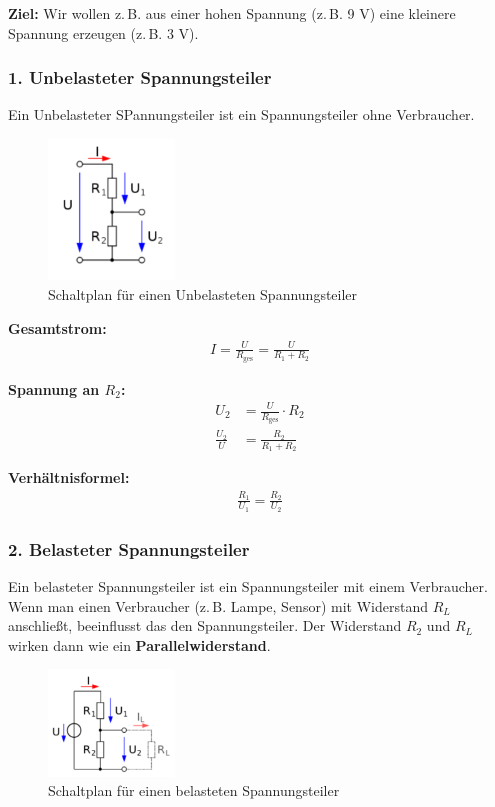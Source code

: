 \documentclass{article}
\begin{document}
\vspace{1em}

\noindent \textbf{Ziel:} Wir wollen z.\,B. aus einer hohen Spannung (z.\,B. 9 V) eine kleinere Spannung erzeugen (z.\,B. 3 V).

\subsubsection*{1. Unbelasteter Spannungsteiler}
Ein Unbelasteter SPannungsteiler ist ein Spannungsteiler ohne Verbraucher.
\begin{figure}[H]
    \centering
    \includegraphics[width=0.3\textwidth]{spannungsteiler 1.png}
    \caption{Schaltplan für einen Unbelasteten Spannungsteiler}
\end{figure}

\textbf{Gesamtstrom:}
\begin{align}
    I =\frac{U}{R_\text{ges}}= \frac{U}{R_1 + R_2}
\end{align}



\textbf{Spannung an $R_2$:}
\begin{align}
U_2 &= \frac{U}{R_\text{ges}}\cdot R_2\\
  \frac{U_2}{U}  &=\frac{R_2}{R_1+R_2}
\end{align}

\textbf{Verhältnisformel:}
\begin{align}
    \frac{R_1}{U_1}=\frac{R_2}{U_2}
\end{align}

\subsubsection*{2. Belasteter Spannungsteiler}
Ein belasteter Spannungsteiler ist ein Spannungsteiler mit einem Verbraucher.
Wenn man einen Verbraucher (z.\,B. Lampe, Sensor) mit Widerstand $R_L$ anschließt, beeinflusst das den Spannungsteiler. Der Widerstand $R_2$ und $R_L$ wirken dann wie ein \textbf{Parallelwiderstand}.

\begin{figure}[H]
    \centering
    \includegraphics[width=0.3\textwidth]{spannungsteiler 2.png}
    \caption{Schaltplan für einen belasteten Spannungsteiler}
\end{figure}
\end{document}
